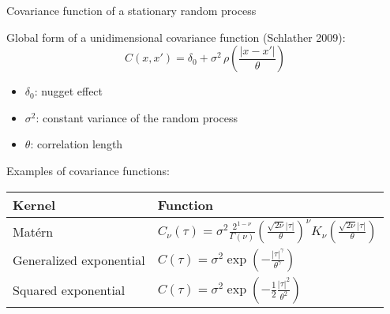 \documentclass[9pt]{beamer}
\newcommand{\absolute}[1]{| #1 |}
\begin{document}
\begin{frame}[t]{Covariance function of a stationary random process}

Global form of a unidimensional covariance function (Schlather 2009):
\[
C(x, x') = \delta_0 + \sigma^2 \, \rho \left( \frac{\absolute{x-x'}}{\theta} \right)
\]

\begin{itemize}
\item $\delta_0$: nugget effect
\item $\sigma^2$: constant variance of the random process
\item $\theta$: correlation length
\end{itemize}

Examples of covariance functions: 
\begin{center}
\begin{tabular}{ll}
  \hline
  Kernel & Function \\
  \hline
  Mat\'{e}rn &  $C_{\nu}(\tau)  = \sigma^2 \frac{2^{1-\nu}}{\Gamma(\nu)}
 \left( \frac{\sqrt{2\nu} \absolute{\tau}}{\theta} \right)^\nu
 K_\nu \left( \frac{\sqrt{2\nu} \absolute{\tau}}{\theta} \right)$ \\
  Generalized exponential &   $C(\tau)  = \sigma^2 \exp \left( -\frac{\absolute{\tau}^\gamma}{\theta^\gamma} \right)$\\
  Squared exponential &  $C(\tau)  = \sigma^2 \exp \left( -\frac{1}{2} \frac{\absolute{\tau}^2}{\theta^2} \right)$ \\
  \hline
\end{tabular}
\end{center}

\end{frame}
\end{document}
